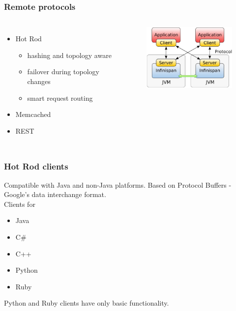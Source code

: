 \documentclass[10pt,utf8]{beamer}
\begin{document}
\begin{frame}
	\frametitle{Remote protocols}
	\begin{columns}
		\begin{itemize}
			\item Hot Rod
				\begin{itemize}
					\item hashing and topology aware
					\item failover during topology changes
					\item smart request routing
				\end{itemize}
			\item Memcached
			\item REST
		\end{itemize}
		\begin{figure}
			\includegraphics[width=5cm]{./img/ispn-cs.eps}
		\end{figure}
	\end{columns}
\end{frame}

\begin{frame}
  \frametitle{Hot Rod clients}
	Compatible with Java and non-Java platforms. Based on Protocol Buffers - Google's data interchange format.\\
	\vspace{0.5cm}
	Clients for
	\begin{itemize}
		\item Java
		\item C\#
		\item C++
		\item Python
		\item Ruby
	\end{itemize}
	Python and Ruby clients have only basic functionality.
\end{frame}
\end{document}

